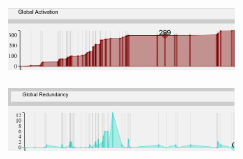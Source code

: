 \begin{multicols}{2}
\begin{center}
\end{center}
\begin{center}
\includegraphics[trim={0 0 0 0}, width=60mm]{./Figures/marieBoucherGlobalActivation.png}
\end{center}
\begin{center}
\includegraphics[trim={0 0 0 0}, width=60mm]{./Figures/marieBoucherGlobalRedundancy.png}
\end{center}
\label{fig:marieBoucherAllGraphs}
\columnbreak




\end{multicols}
